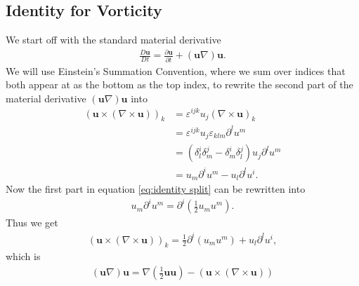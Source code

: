 \subsection{Identity for Vorticity}
\label{appendix:diff identity}
We start off with the standard material derivative
\begin{align}
    \frac{D\mathbf{u}}{Dt} = \frac{\partial \mathbf{u}}{\partial t}
    +(\mathbf{u}\nabla)\mathbf{u}.
\end{align}
We will use Einstein's Summation Convention, where we sum over indices that
both appear at as the bottom as the top index, to rewrite the second part of
the material derivative $(\mathbf{u}\nabla)\mathbf{u}$ into
\begin{align}
    (\mathbf{u}\times (\nabla \times \mathbf{u}))_k
    &= \varepsilon^{ijk}u_j(\nabla \times  \mathbf{u})_k \\
    &= \varepsilon^{ijk}u_j\varepsilon_{klm}\partial^l u^m\\
    &=(\delta^i_l\delta^j_m-\delta^i_m\delta^j_l)u_j\partial^l u^m\\
    &=u_m\partial^i u^m - u_l \partial^l u^i.\label{eq:identity split}
\end{align}
Now the first part in equation \ref{eq:identity split} can be rewritten into
\begin{align}
    u_m\partial^i u^m =\partial^i (\frac{1}{2}u_mu^m) .
\end{align}
Thus we get
\begin{align}
    (\mathbf{u}\times (\nabla \times \mathbf{u}))_k
    = \frac{1}{2}\partial^i(u_m u^m) + u_l \partial^l u^i,
\end{align}
which is
\begin{align}
    (\mathbf{u}\nabla)\mathbf{u} = \nabla(\frac{1}{2}\mathbf{u}\mathbf{u}) -
    \left(\mathbf{u}\times (\nabla \times  \mathbf{u})\right)
\end{align}
